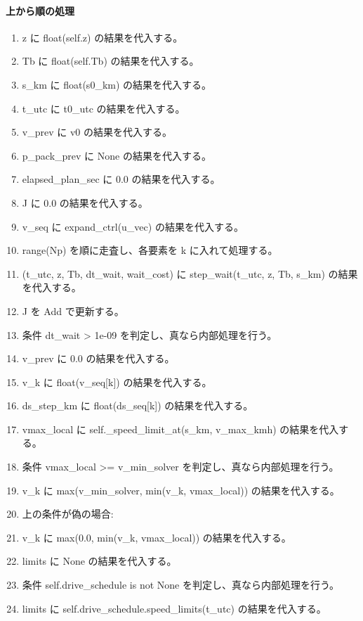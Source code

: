 \documentclass[a4paper,11pt]{article}
\begin{document}
            \paragraph{上から順の処理}
            \begin{enumerate}[leftmargin=1.8em]
            \item z に float(self.z) の結果を代入する。
\item Tb に float(self.Tb) の結果を代入する。
\item s\_km に float(s0\_km) の結果を代入する。
\item t\_utc に t0\_utc の結果を代入する。
\item v\_prev に v0 の結果を代入する。
\item p\_pack\_prev に None の結果を代入する。
\item elapsed\_plan\_sec に 0.0 の結果を代入する。
\item J に 0.0 の結果を代入する。
\item v\_seq に expand\_ctrl(u\_vec) の結果を代入する。
\item range(Np) を順に走査し、各要素を k に入れて処理する。
\item   (t\_utc, z, Tb, dt\_wait, wait\_cost) に step\_wait(t\_utc, z, Tb, s\_km) の結果を代入する。
\item   J を Add で更新する。
\item   条件 dt\_wait > 1e-09 を判定し、真なら内部処理を行う。
\item     v\_prev に 0.0 の結果を代入する。
\item   v\_k に float(v\_seq[k]) の結果を代入する。
\item   ds\_step\_km に float(ds\_seq[k]) の結果を代入する。
\item   vmax\_local に self.\_speed\_limit\_at(s\_km, v\_max\_kmh) の結果を代入する。
\item   条件 vmax\_local >= v\_min\_solver を判定し、真なら内部処理を行う。
\item     v\_k に max(v\_min\_solver, min(v\_k, vmax\_local)) の結果を代入する。
\item     上の条件が偽の場合:
\item     v\_k に max(0.0, min(v\_k, vmax\_local)) の結果を代入する。
\item   limits に None の結果を代入する。
\item   条件 self.drive\_schedule is not None を判定し、真なら内部処理を行う。
\item     limits に self.drive\_schedule.speed\_limits(t\_utc) の結果を代入する。

\end{enumerate}
\end{document}
